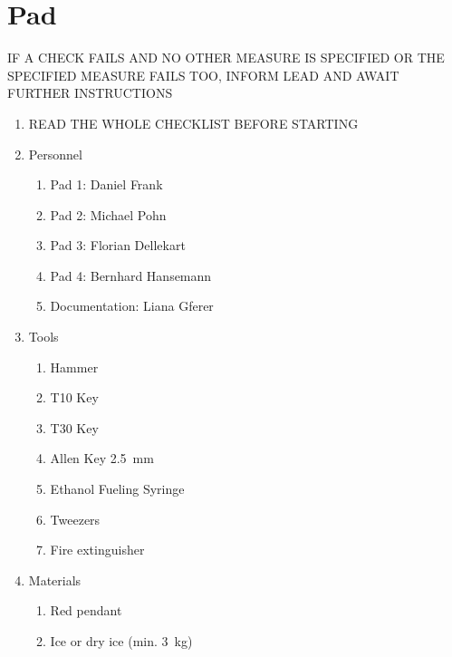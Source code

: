 \newpage
\setcounter{page}{1}
\lfoot{\thepage / \pageref{end_section_pressurant}}
\section*{Pad}



IF A CHECK FAILS AND NO OTHER MEASURE IS SPECIFIED OR THE SPECIFIED MEASURE FAILS TOO, INFORM LEAD AND AWAIT FURTHER INSTRUCTIONS

\begin{enumerate}[label=P\arabic*.]

    \item READ THE WHOLE CHECKLIST BEFORE STARTING \checkbox

    \item \label{pad_personnel} Personnel
        \begin{enumerate}[label*=\arabic*.]
            \item Pad 1: Daniel Frank
            \item Pad 2: Michael Pohn
            \item Pad 3: Florian Dellekart
            \item Pad 4: Bernhard Hansemann
            \item Documentation: Liana Gferer
        \end{enumerate}
    \item \label{pad_tools} Tools \checkbox
        \begin{enumerate}[label*=\arabic*.]
            \item Hammer\leftcheckbox
            \item T10 Key\leftcheckbox
            \item T30 Key\leftcheckbox
            \item Allen Key \SI{2.5}{\milli\meter}\leftcheckbox
            \item Ethanol Fueling Syringe\leftcheckbox
            \item Tweezers\leftcheckbox
            \item Fire extinguisher\leftcheckbox
        \end{enumerate}
    \item \label{pad_materials} Materials \checkbox
        \begin{enumerate}[label*=\arabic*.]
            \item Red pendant\leftcheckbox
            \item Ice or dry ice (min. \SI{3}{\kilo\gram})

\end{enumerate}
\end{enumerate}
